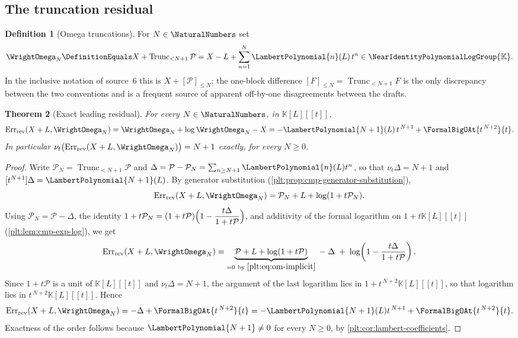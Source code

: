\documentclass[11pt,oneside]{article}
\theoremstyle{plain}
\newtheorem{theorem}{Theorem}[section]
\theoremstyle{definition}
\newtheorem{definition}[theorem]{Definition}
\theoremstyle{remark}
\newcommand{\K}{\mathbb{K}}
\newcommand{\Gnear}{\NearIdentityPolynomialLogGroup{\K}} %
\newcommand{\ordt}{\nu_{t}}                              %
\newcommand{\Trunc}[2]{\operatorname{Trunc}_{<#2}#1}     %
\newcommand{\LamP}[1]{\LambertPolynomial{#1}}
\newcommand{\RevErr}[2]{\operatorname{Err}_{\mathrm{rev}}\!\left(#1,#2\right)}
\begin{document}
\subsection{The truncation residual}
\label{plt:sec:om-residual}

\begin{definition}[Omega truncations]
\label{plt:def:om-truncation}
For \(N\in\NaturalNumbers\) set
\begin{equation}\label{plt:eq:om-truncation}
 \WrightOmega_N
 \DefinitionEquals X+\Trunc{\mathcal P}{N+1}
 =X-L+\sum_{n=1}^{N}\LamP{n}(L)\,t^{n}\in\Gnear .
\end{equation}
In the inclusive notation of source~6 this is \(X+[\mathcal P]_{\le N}\); the
one-block difference \([F]_{\le N}=\Trunc{F}{N+1}\) is the only discrepancy
between the two conventions and is a frequent source of apparent off-by-one
disagreements between the drafts.
\end{definition}

\begin{theorem}[Exact leading residual]
\label{plt:thm:om-residual}
For every \(N\in\NaturalNumbers\), in \(\K[L][[t]]\),
\begin{equation}\label{plt:eq:om-residual}
 \RevErr{X+L}{\WrightOmega_N}
 =\WrightOmega_N+\log\WrightOmega_N-X
 =-\LamP{N+1}(L)\,t^{\,N+1}+\FormalBigOAt{t^{\,N+2}}{t}.
\end{equation}
In particular \(\ordt\bigl(\RevErr{X+L}{\WrightOmega_N}\bigr)=N+1\) exactly,
for every \(N\ge0\).
\end{theorem}

\begin{proof}
Write \(\mathcal P_N=\Trunc{\mathcal P}{N+1}\) and
\(\Delta=\mathcal P-\mathcal P_N=\sum_{n\ge N+1}\LamP{n}(L)t^{n}\), so that
\(\ordt\Delta=N+1\) and \([t^{N+1}]\Delta=\LamP{N+1}(L)\).  By generator
substitution (\cref{plt:prop:cmp-generator-substitution}),
\[
 \RevErr{X+L}{\WrightOmega_N}
 =\mathcal P_N+L+\log(1+t\mathcal P_N).
\]
Using \(\mathcal P_N=\mathcal P-\Delta\), the identity
\(1+t\mathcal P_N=(1+t\mathcal P)\Bigl(1-\dfrac{t\Delta}{1+t\mathcal P}\Bigr)\),
and additivity of the formal logarithm on \(1+t\K[L][[t]]\)
(\cref{plt:lem:cmp-exp-log}), we get
\[
 \RevErr{X+L}{\WrightOmega_N}
 =\underbrace{\mathcal P+L+\log(1+t\mathcal P)}_{=0\ \text{by }\eqref{plt:eq:om-implicit}}
 \;-\;\Delta\;+\;\log\!\left(1-\frac{t\Delta}{1+t\mathcal P}\right).
\]
Since \(1+t\mathcal P\) is a unit of \(\K[L][[t]]\) and \(\ordt\Delta=N+1\),
the argument of the last logarithm lies in \(1+t^{\,N+2}\K[L][[t]]\), so that
logarithm lies in \(t^{\,N+2}\K[L][[t]]\).  Hence
\[
 \RevErr{X+L}{\WrightOmega_N}
 =-\Delta+\FormalBigOAt{t^{\,N+2}}{t}
 =-\LamP{N+1}(L)t^{\,N+1}+\FormalBigOAt{t^{\,N+2}}{t}.
\]
Exactness of the order follows because \(\LamP{N+1}\ne0\) for every
\(N\ge0\), by \cref{plt:cor:lambert-coefficients}.
\end{proof}
\end{document}

